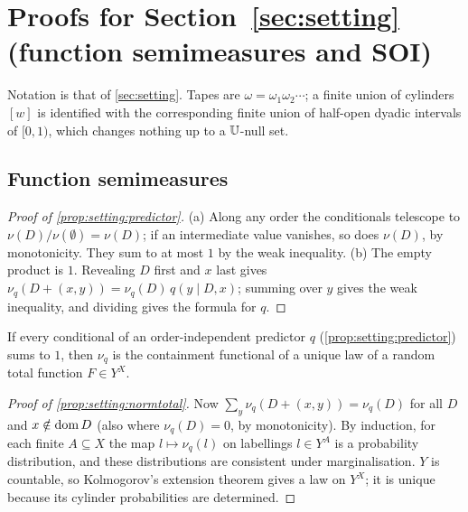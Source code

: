 \section{Proofs for Section~\ref{sec:setting} (function semimeasures and SOI)}\label{app:setting}

Notation is that of \cref{sec:setting}. Tapes are $\omega=\omega_1\omega_2\cdots$; a finite union of cylinders $[w]$ is identified with the corresponding finite union of half-open dyadic intervals of $[0,1)$, which changes nothing up to a $\mathbb{U}$-null set.

\subsection{Function semimeasures}\label{app:setting:mobius}

\begin{proof}[Proof of \cref{prop:setting:predictor}]
(a) Along any order the conditionals telescope to $\nu(D)/\nu(\emptyset)=\nu(D)$; if an intermediate value vanishes, so does $\nu(D)$, by monotonicity. They sum to at most $1$ by the weak inequality. (b) The empty product is $1$. Revealing $D$ first and $x$ last gives $\nu_q(D+(x,y))=\nu_q(D)\,q(y\mid D,x)$; summing over $y$ gives the weak inequality, and dividing gives the formula for $q$.
\end{proof}

\begin{proposition}\label{prop:setting:normtotal}
If every conditional of an order-independent predictor $q$ (\cref{prop:setting:predictor}) sums to $1$, then $\nu_q$ is the containment functional of a unique law of a random total function $F\in Y^X$.
\end{proposition}

\begin{proof}[Proof of \cref{prop:setting:normtotal}]
Now $\sum_y\nu_q(D+(x,y))=\nu_q(D)$ for all $D$ and $x\notin\operatorname{dom} D$ (also where $\nu_q(D)=0$, by monotonicity). By induction, for each finite $A\subseteq X$ the map $l\mapsto\nu_q(l)$ on labellings $l\in Y^A$ is a probability distribution, and these distributions are consistent under marginalisation. $Y$ is countable, so Kolmogorov's extension theorem gives a law on $Y^X$; it is unique because its cylinder probabilities are determined.
\end{proof}

